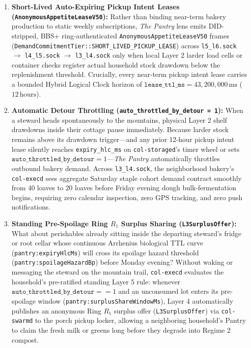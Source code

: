 \begin{enumerate}
    \item \textbf{Short-Lived Auto-Expiring Pickup Intent Leases (\texttt{AnonymousAppetiteLeaseV50}):}
    Rather than binding near-term bakery production to static weekly subscriptions, \emph{The Pantry} lens emits DID-stripped, BBS+ ring-authenticated \texttt{AnonymousAppetiteLeaseV50} frames (\texttt{DemandCommitmentTier::SHORT\_LIVED\_PICKUP\_LEASE}) across \texttt{l5\_l6.sock} $\to$ \texttt{l4\_l5.sock} $\to$ \texttt{l3\_l4.sock} only when local Layer 2 larder load cells or container checks register actual household stock drawdown below the replenishment threshold. Crucially, every near-term pickup intent lease carries a bounded Hybrid Logical Clock horizon of $\texttt{lease\_ttl\_ms} = 43{,}200{,}000\,\mathrm{ms}$ ($12\,\mathrm{hours}$).
    \item \textbf{Automatic Detour Throttling (\texttt{auto\_throttled\_by\_detour = 1}):}
    When a steward heads spontaneously to the mountains, physical Layer 2 shelf drawdowns inside their cottage pause immediately. Because larder stock remains above its drawdown trigger---and any prior 12-hour pickup intent lease silently reaches \texttt{expiry\_hlc\_ms} on \texttt{col-storaged}'s timer wheel or sets $\texttt{auto\_throttled\_by\_detour} = 1$---\emph{The Pantry} automatically throttles outbound bakery demand. Across \texttt{l3\_l4.sock}, the neighborhood bakery's \texttt{col-execd} sees aggregate Saturday staple cohort demand contract smoothly from $40$ loaves to $20$ loaves before Friday evening dough bulk-fermentation begins, requiring zero calendar inspection, zero GPS tracking, and zero push notifications.
    \item \textbf{Standing Pre-Spoilage Ring $R_1$ Surplus Sharing (\texttt{L3SurplusOffer}):}
    What about perishables already sitting inside the departing steward's fridge or root cellar whose continuous Arrhenius biological TTL curve (\texttt{pantry:expiryHlcMs}) will cross its spoilage hazard threshold (\texttt{pantry:spoilageHazardBp}) before Monday evening? Without waking or messaging the steward on the mountain trail, \texttt{col-execd} evaluates the household's pre-ratified standing Layer 5 rule: whenever $\texttt{auto\_throttled\_by\_detour} == 1$ and an unconsumed lot enters its pre-spoilage window (\texttt{pantry:surplusShareWindowMs}), Layer 4 automatically publishes an anonymous Ring $R_1$ surplus offer (\texttt{L3SurplusOffer}) via \texttt{col-swarmd} to the porch pickup locker, allowing a neighboring household's Pantry to claim the fresh milk or greens long before they degrade into Regime 2 compost.
\end{enumerate}


